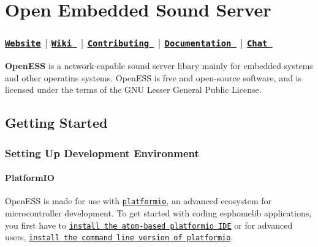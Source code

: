    \section*{Open Embedded Sound Server}

 \subsubsection*{\href{https://roseleblood.github.io/}{\tt Website}  $\vert$  \href{https://github.com/RoseLeBlood/openess/wiki}{\tt Wiki }  $\vert$  \href{https://github.com/RoseLeBlood/openess/blob/master/CONTRIBUTING.md}{\tt Contributing }  $\vert$  \href{https://roseleblood.github.io/openess/html/d3/dcc/md__r_e_a_d_m_e.html}{\tt Documentation }  $\vert$  \href{https://webchat.freenode.net/?channels=openess}{\tt Chat } }



 



{\bfseries Open\+E\+SS} is a network-\/capable sound server libary mainly for embedded systems and other operatins systems. Open\+E\+SS is free and open-\/source software, and is licensed under the terms of the G\+NU Lesser General Public License.

\href{https://www.codacy.com/app/RoseLeBlood/openess?utm_source=github.com&amp;utm_medium=referral&amp;utm_content=RoseLeBlood/openess&amp;utm_campaign=Badge_Grade}{\tt }

\subsection*{Getting Started}

\subsubsection*{Setting Up Development Environment}

\paragraph*{Platform\+IO}

Open\+E\+SS is made for use with \href{http://platformio.org/}{\tt platformio}, an advanced ecosystem for microcontroller development. To get started with coding esphomelib applications, you first have to \href{http://platformio.org/platformio-ide}{\tt install the atom-\/based platformio I\+DE} or for advanced users, \href{http://docs.platformio.org/en/latest/installation.html}{\tt install the command line version of platformio}.


